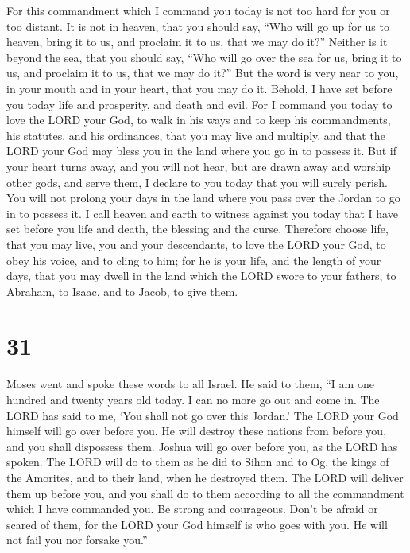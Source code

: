  For this commandment which I command you today is not
too hard for you or too distant.  It is not in heaven,
that you should say, ``Who will go up for us to heaven, bring it to us,
and proclaim it to us, that we may do it?''  Neither is
it beyond the sea, that you should say, ``Who will go over the sea for
us, bring it to us, and proclaim it to us, that we may do it?''
 But the word is very near to you, in your mouth and in
your heart, that you may do it.  Behold, I have set
before you today life and prosperity, and death and evil.
 For I command you today to love the LORD your God, to
walk in his ways and to keep his commandments, his statutes, and his
ordinances, that you may live and multiply, and that the LORD your God
may bless you in the land where you go in to possess it. 
But if your heart turns away, and you will not hear, but are drawn away
and worship other gods, and serve them,  I declare to you
today that you will surely perish. You will not prolong your days in the
land where you pass over the Jordan to go in to possess it.
 I call heaven and earth to witness against you today
that I have set before you life and death, the blessing and the curse.
Therefore choose life, that you may live, you and your descendants,
 to love the LORD your God, to obey his voice, and to
cling to him; for he is your life, and the length of your days, that you
may dwell in the land which the LORD swore to your fathers, to Abraham,
to Isaac, and to Jacob, to give them.

\hypertarget{section-30}{%
\section{31}\label{section-30}}

 Moses went and spoke these words to all Israel.
 He said to them, ``I am one hundred and twenty years old
today. I can no more go out and come in. The LORD has said to me, `You
shall not go over this Jordan.'  The LORD your God himself
will go over before you. He will destroy these nations from before you,
and you shall dispossess them. Joshua will go over before you, as the
LORD has spoken.  The LORD will do to them as he did to
Sihon and to Og, the kings of the Amorites, and to their land, when he
destroyed them.  The LORD will deliver them up before you,
and you shall do to them according to all the commandment which I have
commanded you.  Be strong and courageous. Don't be afraid
or scared of them, for the LORD your God himself is who goes with you.
He will not fail you nor forsake you.''

